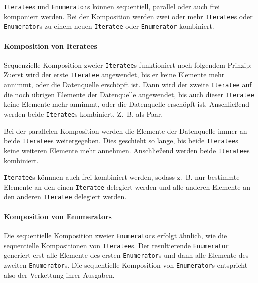 \documentclass[draft=false
              ,paper=a4
              ,twoside=false
              ,fontsize=11pt
              ,headsepline
              ,BCOR10mm
              ,DIV11
              ]{scrbook}
\begin{document}
\lstinline|Iteratee|s und \lstinline|Enumerator|s können sequentiell, parallel oder auch frei komponiert werden.
Bei der Komposition werden zwei oder mehr \lstinline|Iteratee|s oder \lstinline|Enumerator|s zu einem neuen \lstinline|Iteratee| oder \lstinline|Enumerator| kombiniert.

\paragraph{Komposition von Iteratees} %
\label{par:komposition_von_iteratees}\mbox{} %

Sequenzielle Komposition zweier \lstinline|Iteratee|s funktioniert noch folgendem Prinzip:
Zuerst wird der erste \lstinline|Iteratee| angewendet, bis er keine Elemente mehr annimmt, oder die Datenquelle erschöpft ist.
Dann wird der zweite \lstinline|Iteratee| auf die noch übrigen Elemente der Datenquelle angewendet, bis auch dieser \lstinline|Iteratee| keine Elemente mehr annimmt, oder die Datenquelle erschöpft ist.
Anschließend werden beide \lstinline|Iteratee|s kombiniert.
Z.~B. als Paar.

Bei der parallelen Komposition werden die Elemente der Datenquelle immer an beide \lstinline|Iteratee|s weitergegeben.
Dies geschieht so lange, bis beide \lstinline|Iteratee|s keine weiteren Elemente mehr annehmen.
Anschließend werden beide \lstinline|Iteratee|s kombiniert.

\lstinline|Iteratee|s könnnen auch frei kombiniert werden, sodass z.~B. nur bestimmte Elemente an den einen \lstinline|Iteratee| delegiert werden und alle anderen Elemente an den anderen \lstinline|Iteratee| delegiert werden.


\paragraph{Komposition von Enumerators} %
\label{par:komposition_von_enumerators}\mbox{} %

Die sequentielle Komposition zweier \lstinline|Enumerator|s erfolgt ähnlich, wie die sequentielle Kompositionen von \lstinline|Iteratee|s.
Der resultierende \lstinline|Enumerator| generiert erst alle Elemente des ersten \lstinline|Enumerator|s und dann alle Elemente des zweiten \lstinline|Enumerator|s.
Die sequentielle Komposition von \lstinline|Enumerator|s entspricht also der Verkettung ihrer Ausgaben.
\end{document}
